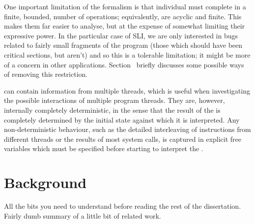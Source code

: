One important limitation of the \StateMachine formalism is that individual \StateMachines must complete in a finite, bounded, number of operations; equivalently, \StateMachines are acyclic and finite.
This makes them far easier to analyse, but at the expense of somewhat limiting their expressive power.
In the particular case of SLI, we are only interested in bugs related to fairly small fragments of the program (those which should have been critical sections, but aren't) and so this is a tolerable limitation; it might be more of a concern in other applications.
Section~ briefly discusses some possible ways of removing this restriction.

\STateMachines can contain information from multiple threads, which is useful when investigating the possible interactions of multiple program threads.
They are, however, internally completely deterministic, in the sense that the result of the \StateMachine is completely determined by the initial state against which it is interpreted.
Any non-deterministic behaviour, such as the detailed interleaving of instructions from different threads or the results of most system calls, is captured in explicit free variables which must be specified before starting to interpret the \StateMachine.


\section{Background}
All the bits you need to understand before reading the rest of the dissertation.
Fairly dumb summary of a little bit of related work.
